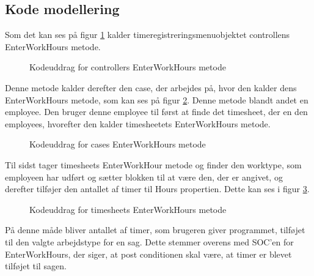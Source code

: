 \subsection{Kode modellering}

Som det kan ses på figur \ref{fig:ControllerEnterWorkHours} kalder timeregistreringsmenuobjektet controllens EnterWorkHours metode.

\begin{figure}[H]
    \caption{Kodeuddrag for controllers EnterWorkHours metode}
    \label{fig:ControllerEnterWorkHours}
\end{figure}

Denne metode kalder derefter den case, der arbejdes på, hvor den kalder dens EnterWorkHours metode, som kan ses på figur \ref{fig:CaseEnterWorkHours}.
Denne metode blandt andet en employee.
Den bruger denne employee til først at finde det timesheet, der en den employees, hvorefter den kalder timesheetets EnterWorkHours metode.

\begin{figure}[H]
    \caption{Kodeuddrag for cases EnterWorkHours metode}
    \label{fig:CaseEnterWorkHours}
\end{figure}

Til sidst tager timesheets EnterWorkHour metode og finder den worktype, som employeen har udført og sætter blokken til at være den, der er angivet, og derefter tilføjer den antallet af timer til Hours propertien. Dette kan ses i figur \ref{fig:TimeSheetEnterWorkHours}.

\begin{figure}[H]
    \caption{Kodeuddrag for timesheets EnterWorkHours metode}
    \label{fig:TimeSheetEnterWorkHours}
\end{figure}

På denne måde bliver antallet af timer, som brugeren giver programmet, tilføjet til den valgte arbejdstype for en sag.
Dette stemmer overens med SOC'en for EnterWorkHours, der siger, at post conditionen skal være, at timer er blevet tilføjet til sagen.

